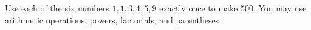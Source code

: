 Use each of the six numbers $1,1,3,4,5,9$ exactly once to make 500. You may use arithmetic operations, powers, factorials, and parentheses.
